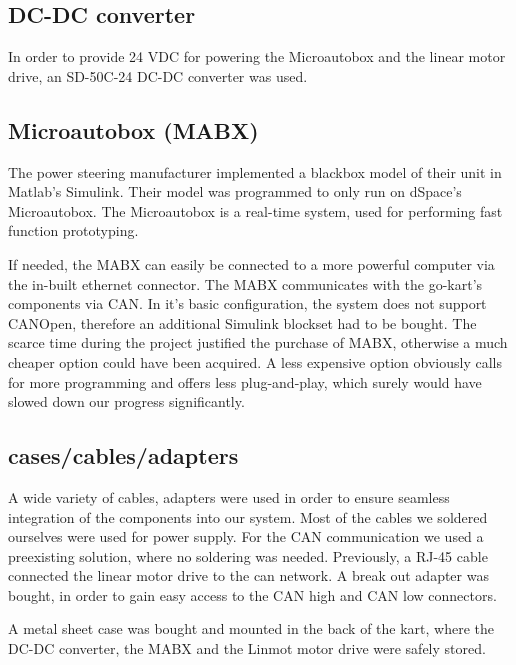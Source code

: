 \subsection{DC-DC converter}
In order to provide 24 VDC for powering the Microautobox and the linear motor drive, an SD-50C-24 DC-DC converter was used.

\subsection{Microautobox (MABX)}
The power steering manufacturer implemented a blackbox model of their unit in Matlab's Simulink. Their model was programmed to only run on dSpace's Microautobox. The Microautobox is a real-time system, used for performing fast function prototyping.

If needed, the MABX can easily be connected to a more powerful computer via the in-built ethernet connector. The MABX communicates with the go-kart's components via CAN. In it's basic configuration, the system does not support CANOpen, therefore an additional Simulink blockset had to be bought. The scarce time during the project justified the purchase of MABX, otherwise a much cheaper option could have been acquired. A less expensive option obviously calls for more programming and offers less plug-and-play, which surely would have slowed down our progress significantly. 

\subsection{cases/cables/adapters}
A wide variety of cables, adapters were used in order to ensure seamless integration of the components into our system.
Most of the cables we soldered ourselves were used for power supply.
For the CAN communication we used a preexisting solution, where no soldering was needed. 
Previously, a RJ-45 cable connected the linear motor drive to the can network. A break out adapter was bought, in order to gain easy access to the CAN high and CAN low connectors.


A metal sheet case was bought and mounted in the back of the kart, where the DC-DC converter, the MABX and the Linmot motor drive were safely stored.